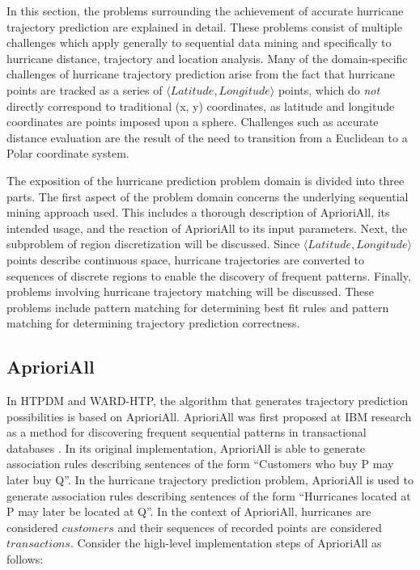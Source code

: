 \documentclass[12pt,conference]{IEEEtran}
\begin{document}
In this section, the problems surrounding the achievement of accurate hurricane trajectory prediction are explained in detail. These problems consist of multiple challenges which apply generally to sequential data mining and specifically to hurricane distance, trajectory and location analysis. Many of the domain-specific challenges of hurricane trajectory prediction arise from the fact that hurricane points are tracked as a series of $\langle Latitude, Longitude \rangle$ points, which do \textit{not} directly correspond to traditional (x, y) coordinates, as latitude and longitude coordinates are points imposed upon a sphere. Challenges such as accurate distance evaluation are the result of the need to transition from a Euclidean to a Polar coordinate system.

The exposition of the hurricane prediction problem domain is divided into three parts. The first aspect of the problem domain concerns the underlying sequential mining approach used. This includes a thorough description of AprioriAll, its intended usage, and the reaction of AprioriAll to its input parameters. Next, the subproblem of region discretization will be discussed. Since $\langle Latitude, Longitude \rangle$ points describe continuous space, hurricane trajectories are converted to sequences of discrete regions to enable the discovery of frequent patterns. Finally, problems involving hurricane trajectory matching will be discussed. These problems include pattern matching for determining best fit rules and pattern matching for determining trajectory prediction correctness.

\subsection{AprioriAll}

In HTPDM and WARD-HTP, the algorithm that generates trajectory prediction possibilities is based on AprioriAll. AprioriAll was first proposed at IBM research as a method for discovering frequent sequential patterns in transactional databases \cite{AprioriAll-original}. In its original implementation, AprioriAll is able to generate association rules describing sentences of the form ``Customers who buy P may later buy Q''. In the hurricane trajectory prediction problem, AprioriAll is used to generate association rules describing sentences of the form ``Hurricanes located at P may later be located at Q''. In the context of AprioriAll, hurricanes are considered $customers$ and their sequences of recorded points are considered $transactions$. Consider the high-level implementation steps of AprioriAll as follows:
\end{document}
